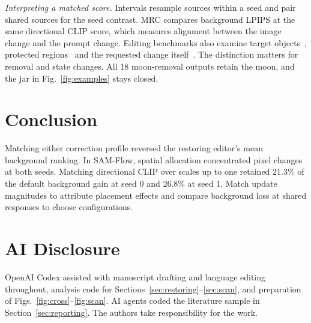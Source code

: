 \documentclass[10pt,doubleanonymous]{ieeeconf}
\begin{document}
\noindent\textit{Interpreting a matched score.} Intervals resample sources within a seed and pair shared sources for the seed contrast. MRC compares background LPIPS at the same directional CLIP score, which measures alignment between the image change and the prompt change. Editing benchmarks also examine target objects~\cite{basu2023editval,ma2024i2ebench,qian2025giebench}, protected regions~\cite{wang2023editbench,kim2025augclip} and the requested change itself~\cite{sheynin2024emuedit,baraldi2025changed,ryu2025human,li2025bpm}. The distinction matters for removal and state changes. All 18 moon-removal outputs retain the moon, and the jar in Fig.~\ref{fig:examples} stays closed.

\section{Conclusion}
Matching either correction profile reversed the restoring editor's mean background ranking. In SAM-Flow, spatial allocation concentrated pixel changes at both seeds. Matching directional CLIP over scales up to one retained 21.3\% of the default background gain at seed 0 and 26.8\% at seed 1. Match update magnitudes to attribute placement effects and compare background loss at shared responses to choose configurations.

\section*{AI Disclosure}
OpenAI Codex assisted with manuscript drafting and language editing throughout, analysis code for Sections~\ref{sec:restoring}--\ref{sec:scan}, and preparation of Figs.~\ref{fig:cross}--\ref{fig:scan}. AI agents coded the literature sample in Section~\ref{sec:reporting}. The authors take responsibility for the work.

\end{document}
